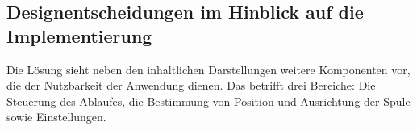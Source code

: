\subsection{Designentscheidungen im Hinblick auf die Implementierung}
\label{sec-4-6}
Die Lösung sieht neben den inhaltlichen Darstellungen weitere Komponenten vor, die der Nutzbarkeit der Anwendung dienen. Das betrifft drei Bereiche: Die Steuerung des Ablaufes, die Bestimmung von Position und Ausrichtung der Spule sowie Einstellungen.\\

